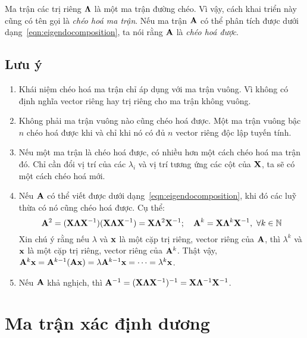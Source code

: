 Ma trận các trị riêng $\boldsymbol{\Lambda}$ là một ma trận đường chéo. Vì vậy, cách khai
triển này cũng có tên gọi là \textit{chéo hoá ma trận}. Nếu ma trận $\mathbf{A}$ có thể
phân tích được dưới dạng~\eqref{eqn:eigendocomposition}, ta nói rằng $\mathbf{A}$ là
\textit{chéo hoá được}.

\subsection{Lưu ý} %
\label{sub:luu y}

\begin{enumerate}

\item Khái niệm chéo hoá ma trận chỉ áp dụng với ma trận vuông. Vì không có
định nghĩa vector riêng hay trị riêng cho ma trận không vuông.

\item Không phải ma trận vuông nào cũng chéo hoá được. Một ma trận
vuông bậc $n$ chéo hoá được khi và chỉ khi nó có đủ $n$ vector riêng độc lập
tuyến tính.

\item Nếu một ma trận là chéo hoá được, có nhiều hơn một cách chéo hoá ma
trận đó. Chỉ cần đổi vị trí của các $\lambda_i$ và vị trí tương ứng
các cột của $\mathbf{X}$, ta sẽ có một cách chéo hoá mới.

\item Nếu $\mathbf{A}$ có thể viết được dưới dạng~\eqref{eqn:eigendocomposition},
khi đó các luỹ thừa có nó cũng chéo hoá được. Cụ thể:
\begin{equation}
\mathbf{A}^2 = (\mathbf{X} \boldsymbol{\Lambda} \mathbf{X}^{-1})(\mathbf{X} \boldsymbol{\Lambda} \mathbf{X}^{-1}) =
\mathbf{X}\boldsymbol{\Lambda}^2\mathbf{X}^{-1}; \quad \mathbf{A}^k = \mathbf{X} \boldsymbol{\Lambda}^k \mathbf{X}^{-1}, ~\forall k \in
\mathbb{N}
\end{equation}
Xin chú ý rằng nếu $\lambda$ và $\mathbf{x}$ là một cặp trị riêng, vector riêng
của $\mathbf{A}$, thì $\lambda^k$ và $\mathbf{x}$ là một cặp  trị riêng, vector riêng
của $\mathbf{A}^k$. Thật vậy, $\mathbf{A}^k \mathbf{x} = \mathbf{A}^{k-1}(\mathbf{A}\mathbf{x}) = \lambda \mathbf{A}^
{k-1}\mathbf{x} = \dots = \lambda^k \mathbf{x}$.

\item Nếu $\mathbf{A}$ khả nghịch, thì $\mathbf{A}^{-1} = (\mathbf{X} \boldsymbol{\Lambda} \mathbf{X}^{-1})^{-1} =
\mathbf{X} \boldsymbol{\Lambda}^{-1}\mathbf{X}^{-1}$.
\end{enumerate}


\section{Ma trận xác định dương} %
\label{sec:ma_tran_xac_dinh_duong}

